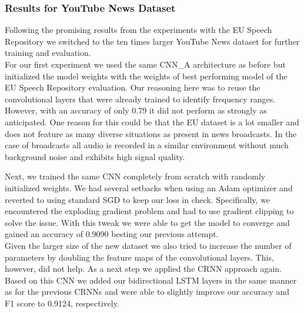 \subsubsection{Results for YouTube News Dataset}
\label{sec:results_news}
Following the promising results from the experiments with the EU Speech Repository we switched to the ten times larger YouTube News dataset for further training and evaluation.\\
For our first experiment we used the same CNN\_A architecture as before but initialized the model weights with the weights of best performing model of the EU Speech Repository evaluation. Our reasoning here was to reuse the convolutional layers that were already trained to identify frequency ranges. However, with an accuracy of only 0.79 it did not perform as strongly as anticipated. One reason for this could be that the EU dataset is a lot smaller and does not feature as many diverse situations as present in news broadcasts. In the case of broadcasts all audio is recorded in a similar environment without much background noise and exhibits high signal quality.

Next, we trained the same CNN completely from scratch with randomly initialized weights. We had several setbacks when using an Adam optimizer and reverted to using standard SGD to keep our loss in check. Specifically, we encountered the exploding gradient problem\cite[ch. 8.2.4, p. 288]{Goodfellow-et-al-2016} and had to use gradient clipping to solve the issue. With this tweak we were able to get the model to converge and gained an accuracy of 0.9090 besting our previous attempt.\\ 
Given the larger size of the new dataset we also tried to increase the number of parameters by doubling the feature maps of the convolutional layers. This, however, did not help. As a next step we applied the CRNN approach again. Based on this CNN we added our bidirectional LSTM layers in the same manner as for the previous CRNNs and were able to slightly improve our accuracy and F1 score to 0.9124, respectively. 

